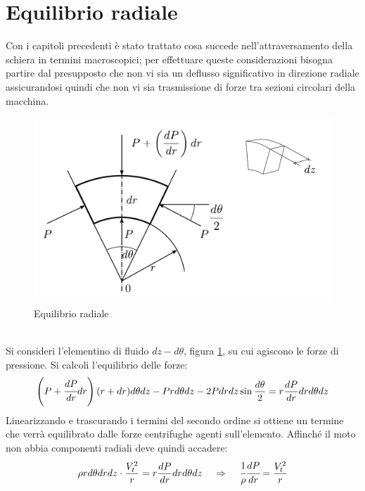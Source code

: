 \section{Equilibrio radiale}
Con i capitoli precedenti è stato trattato cosa succede nell'attraversamento della schiera in termini macroscopici; per effettuare queste considerazioni bisogna partire dal presupposto che non vi sia un deflusso significativo in direzione radiale assicurandosi quindi che non vi sia trasmissione di forze tra sezioni circolari della macchina.
\begin{figure}[h!]
	\centering
	\includegraphics[width=.6\textwidth]{fig/concio.pdf}
	\caption{Equilibrio radiale}
	\label{fig:concio}
\end{figure}
\\Si consideri l'elementino di fluido $dz - d\theta$, figura \ref{fig:concio}, su cui agiscono le forze di pressione. Si calcoli l'equilibrio delle forze:
\begin{align*}
\left( P + \cfrac{dP}{dr} dr \right) (r + dr) d \theta dz - Pr d \theta dz -2P dr dz \sin \frac{d \theta}{2} = r \frac{dP}{dr} dr d \theta dz
\end{align*}
Linearizzando e trascurando i termini del secondo ordine si ottiene un termine che verrà equilibrato dalle forze centrifughe agenti sull'elemento. Affinché il moto non abbia componenti radiali deve quindi accadere:
\begin{equation}
\rho r d \theta dr dz \cdot \frac{V_t^2}{r} = r \frac{dP}{dr} dr d \theta dz \;\;\;\; \Rightarrow \;\;\;\; \cfrac{1}{\rho} \cfrac{dP}{dr} = \frac{V_t^2}{r}
\label{eq:EquilibrioRad}
\end{equation}
